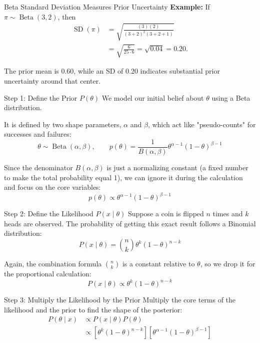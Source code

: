 \documentclass[aspectratio=43,11pt]{beamer}
\newcommand{\BetaDist}{\operatorname{Beta}}
\begin{document}
{\begin{frame}{Beta Standard Deviation Measures Prior Uncertainty}
    \textbf{Example:} If \(\pi\sim\BetaDist(3,2)\), then
    \begin{align*}
      \operatorname{SD}(\pi)
        &=\sqrt{\frac{(3)(2)}{(3+2)^2(3+2+1)}}\\
        &=\sqrt{\frac{6}{25\cdot6}}
         =\sqrt{0.04}=0.20.
    \end{align*}

    \begin{block}{}
      The prior mean is 0.60, while an SD of 0.20 indicates substantial prior
      uncertainty around that center.
    \end{block}
  \end{frame}
  }

  \begin{frame}{Step 1: Define the Prior $P(\theta)$}
    We model our initial belief about $\theta$ using a Beta distribution.

    It is defined by two shape parameters, $\alpha$ and $\beta$, which act like "pseudo-counts" for successes and failures:
    \[
    \theta\sim\operatorname{Beta}(\alpha,\beta),\qquad
    p(\theta)=\frac{1}{B(\alpha,\beta)}\theta^{\alpha-1}(1-\theta)^{\beta-1}
    \]

    \pause
    \vspace{.75cm}
    Since the denominator $B(\alpha,\beta)$ is just a normalizing constant (a fixed number to make the total probability equal 1), we can ignore it during the calculation and focus on the core variables:
    \[
    p(\theta)\propto\theta^{\alpha-1}(1-\theta)^{\beta-1}
    \]
  \end{frame}

  \begin{frame}{Step 2: Define the Likelihood $P(x\mid\theta)$}
    Suppose a coin is flipped $n$ times and $k$ heads are observed.
    The probability of getting this exact result follows a Binomial distribution:
    \[
    P(x\mid\theta)=\binom{n}{k}\theta^k(1-\theta)^{n-k}
    \]

    \pause
    \vspace{.75cm}
    Again, the combination formula $\binom{n}{k}$ is a constant relative to $\theta$, so we drop it for the proportional calculation:
    \[
    P(x\mid\theta)\propto\theta^k(1-\theta)^{n-k}
    \]
  \end{frame}

  \begin{frame}{Step 3: Multiply the Likelihood by the Prior}
    Multiply the core terms of the likelihood and the prior to find the shape of the posterior:
    \begin{align*}
      P(\theta\mid x)
      &\propto P(x\mid\theta)P(\theta)\\
      &\propto [\theta^k(1-\theta)^{n-k}]
      [\theta^{\alpha-1}(1-\theta)^{\beta-1}]
    \end{align*}
  \end{frame}
\end{document}

